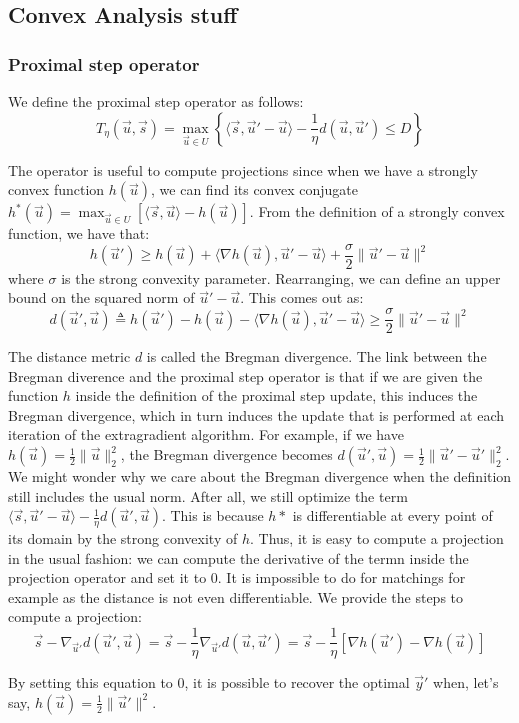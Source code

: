 \subsection*{Convex Analysis stuff}
\subsubsection*{Proximal step operator} \label{proxstep}
We define the proximal step operator as follows:
\begin{equation}
  {T}_{\eta}(\vec u, \vec s) = \max_{\vec u \in {U}} \left \{
\langle \vec s, \vec u' - \vec u \rangle - \frac{1}{\eta} d(\vec u, \vec u')
\leq D \right \}
\end{equation}

The operator is useful to compute projections since when we have a strongly
convex function $h(\vec u)$, we can find its convex conjugate $h^*(\vec u) =
\max_{\vec u \in {U}} \left [ \langle \vec s, \vec u \rangle - h(\vec u)
\right ]$. From the definition of a strongly convex function, we have that:
\begin{equation}
  h(\vec u') \geq h(\vec u) + \langle \nabla h(\vec u), \vec u' - \vec u \rangle
+ \frac{\sigma}{2} \lVert \vec u' - \vec u \rVert^2
\end{equation}
where $\sigma$ is the strong convexity parameter. Rearranging, we can define an
upper bound on the squared norm of $\vec u' - \vec u$. This comes out as:
\begin{equation}
  d(\vec u', \vec u) \triangleq h(\vec u') - h(\vec u) - \langle \nabla h(\vec u), \vec u' - \vec u \rangle \geq \frac{\sigma}{2} \lVert \vec u' - \vec u \rVert^2
\end{equation}

The distance metric $d$ is called the Bregman divergence. The link between the
Bregman diverence and the proximal step operator is that if we are given the
function $h$ inside the definition of the proximal step update, this induces the
Bregman divergence, which in turn induces the update that is performed at each
iteration of the extragradient algorithm. For example, if we have $h(\vec u) =
\frac{1}{2} \lVert \vec u \rVert_2^2 $, the Bregman divergence becomes $d(\vec
u', \vec u) = \frac{1}{2} \lVert \vec u' - \vec u' \rVert_2^2$. We might wonder
why we care about the Bregman divergence when the definition still includes the
usual norm. After all, we still optimize the term $\langle \vec s, \vec u' -
\vec u \rangle - \frac{1}{\eta} d(\vec u', \vec u)$. This is because $h*$ is
differentiable at every point of its domain by the strong convexity of $h$.
Thus, it is easy to compute a projection in the usual fashion: we can compute
the derivative of the termn inside the projection operator and set it to 0. It
is impossible to do for matchings for example as the distance is not even
differentiable. We provide the steps to compute a projection:
\begin{equation}
  \vec s - \nabla_{\vec u'} d(\vec u', \vec u) = \vec s - \frac{1}{\eta}
\nabla_{\vec u'} d(\vec u, \vec u') = \vec s - \frac{1}{\eta} \left [\nabla
h(\vec u') - \nabla h(\vec u) \right]
\end{equation}

By setting this equation to 0, it is possible to recover the optimal $\vec y'$
when, let's say, $h(\vec u) = \frac{1}{2} \lVert \vec u' \rVert^2$.

